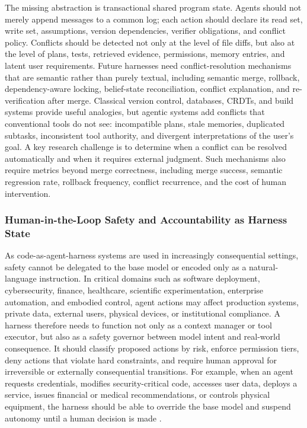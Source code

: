 The missing abstraction is transactional shared program state. Agents should not merely append messages to a common log; each action should declare its read set, write set, assumptions, version dependencies, verifier obligations, and conflict policy. Conflicts should be detected not only at the level of file diffs, but also at the level of plans, tests, retrieved evidence, permissions, memory entries, and latent user requirements. Future harnesses need conflict-resolution mechanisms that are semantic rather than purely textual, including semantic merge, rollback, dependency-aware locking, belief-state reconciliation, conflict explanation, and re-verification after merge. Classical version control, databases, CRDTs, and build systems provide useful analogies, but agentic systems add conflicts that conventional tools do not see: incompatible plans, stale memories, duplicated subtasks, inconsistent tool authority, and divergent interpretations of the user's goal. A key research challenge is to determine when a conflict can be resolved automatically and when it requires external judgment. Such mechanisms also require metrics beyond merge correctness, including merge success, semantic regression rate, rollback frequency, conflict recurrence, and the cost of human intervention.


\subsubsection{Human-in-the-Loop Safety and Accountability as Harness State}

As code-as-agent-harness systems are used in increasingly consequential settings, safety cannot be delegated to the base model or encoded only as a natural-language instruction. In critical domains such as software deployment, cybersecurity, finance, healthcare, scientific experimentation, enterprise automation, and embodied control, agent actions may affect production systems, private data, external users, physical devices, or institutional compliance. A harness therefore needs to function not only as a context manager or tool executor, but also as a safety governor between model intent and real-world consequence. It should classify proposed actions by risk, enforce permission tiers, deny actions that violate hard constraints, and require human approval for irreversible or externally consequential transitions. For example, when an agent requests credentials, modifies security-critical code, accesses user data, deploys a service, issues financial or medical recommendations, or controls physical equipment, the harness should be able to override the base model and suspend autonomy until a human decision is made \citep{Nunez2024AutoSafeCoder,vijayvargiya2025openagentsafety,guan2025normcode}.

